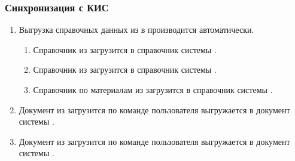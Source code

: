\subsubsection{Синхронизация с КИС}
\label{bp:sales_integration}


\begin{enumerate}
\item Выгрузка справочных данных из \gofro в \erp производится автоматически.
\begin{enumerate}
\item 	Справочник   из \erp загрузится в справочник   системы \gofro.
\item	Справочник   из \erp загрузится в справочник   системы \gofro.
\item	Справочник   по материалам из \erp загрузится в справочник   системы \gofro.
\end{enumerate}




\item	Документ  из \erp загрузится по команде пользователя  выгружается в документ  системы \gofro. 
\item	Документ  из \erp загрузится по команде пользователя  выгружается в документ  системы \gofro. 



\end{enumerate}